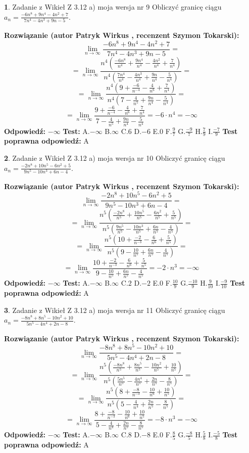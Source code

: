 \documentclass[12pt, a4paper]{article}
\theoremstyle{definition} %
\newtheorem{zad}{}
\newcommand{\zadStart}[1]{\begin{zad}#1\newline}
\newcommand{\zadStop}{\end{zad}}
\newcommand{\rozwStart}[2]{\noindent \textbf{Rozwiązanie (autor #1 , recenzent #2): }\newline}
\newcommand{\rozwStop}{\newline}
\newcommand{\odpStart}{\noindent \textbf{Odpowiedź:}\newline}
\newcommand{\odpStop}{\newline}
\newcommand{\testStart}{\noindent \textbf{Test:}\newline}
\newcommand{\testStop}{\newline}
\newcommand{\kluczStart}{\noindent \textbf{Test poprawna odpowiedź:}\newline}
\newcommand{\kluczStop}{\newline}
\begin{document}
\zadStart{Zadanie z Wikieł Z 3.12 a) moja wersja nr 9}
Obliczyć granicę ciągu $a_{n}=\frac{-6n^{8}+9n^{4}-4n^{2}+7}{7n^{4}-4n^{3}+9n-5}$.
\zadStop
\rozwStart{Patryk Wirkus}{Szymon Tokarski}
$$\lim\limits_{n\to\infty}\frac{-6n^{8}+9n^{4}-4n^{2}+7}{7n^{4}-4n^{3}+9n-5}=$$
$$=\lim\limits_{n\to\infty}\frac{n^{4}\left(\frac{-6n^{8}}{n^{4}}+\frac{9n^{4}}{n^{4}}-\frac{4n^{2}}{n^{4}}+\frac{7}{n^{4}}\right)}{n^{4}\left(\frac{7n^{4}}{n^{4}}-\frac{4n^{3}}{n^{4}}+\frac{9n}{n^{4}}-\frac{5}{n^{4}}\right)}=$$
$$=\lim\limits_{n\to\infty}\frac{n^{4}\left(9+\frac{-6}{n^{-4}}-\frac{4}{n^{6}}+\frac{7}{n^{4}}\right)}
{n^{4}\left(7-\frac{4}{n^{5}}+\frac{9n}{n^{4}}-\frac{5}{n^{4}}\right)}=$$
$$=\lim\limits_{n\to\infty}\frac{9+\frac{-6}{n^{-4}}-\frac{4}{n^{6}}+\frac{7}{n^{4}}}{7-\frac{4}{n^{5}}+\frac{9n}{n^{4}}-\frac{5}{n^{4}}}=-6\cdot n^{4} = -\infty$$
\rozwStop
\odpStart
$-\infty$
\odpStop
\testStart
A.$-\infty$
B.$\infty$
C.$6$
D.$-6$
E.$0$
F.$\frac{9}{7}$
G.$\frac{-9}{7}$
H.$\frac{7}{9}$
I.$\frac{-7}{9}$
\testStop
\kluczStart
A
\kluczStop



\zadStart{Zadanie z Wikieł Z 3.12 a) moja wersja nr 10}
Obliczyć granicę ciągu $a_{n}=\frac{-2n^{8}+10n^{5}-6n^{2}+5}{9n^{5}-10n^{3}+6n-4}$.
\zadStop
\rozwStart{Patryk Wirkus}{Szymon Tokarski}
$$\lim\limits_{n\to\infty}\frac{-2n^{8}+10n^{5}-6n^{2}+5}{9n^{5}-10n^{3}+6n-4}=$$
$$=\lim\limits_{n\to\infty}\frac{n^{5}\left(\frac{-2n^{8}}{n^{5}}+\frac{10n^{5}}{n^{5}}-\frac{6n^{2}}{n^{5}}+\frac{5}{n^{5}}\right)}{n^{5}\left(\frac{9n^{5}}{n^{5}}-\frac{10n^{3}}{n^{5}}+\frac{6n}{n^{5}}-\frac{4}{n^{5}}\right)}=$$
$$=\lim\limits_{n\to\infty}\frac{n^{5}\left(10+\frac{-2}{n^{-3}}-\frac{6}{n^{6}}+\frac{5}{n^{5}}\right)}
{n^{5}\left(9-\frac{10}{n^{5}}+\frac{6n}{n^{5}}-\frac{4}{n^{5}}\right)}=$$
$$=\lim\limits_{n\to\infty}\frac{10+\frac{-2}{n^{-3}}-\frac{6}{n^{6}}+\frac{5}{n^{5}}}{9-\frac{10}{n^{5}}+\frac{6n}{n^{5}}-\frac{4}{n^{5}}}=-2\cdot n^{3} = -\infty$$
\rozwStop
\odpStart
$-\infty$
\odpStop
\testStart
A.$-\infty$
B.$\infty$
C.$2$
D.$-2$
E.$0$
F.$\frac{10}{9}$
G.$\frac{-10}{9}$
H.$\frac{9}{10}$
I.$\frac{-9}{10}$
\testStop
\kluczStart
A
\kluczStop



\zadStart{Zadanie z Wikieł Z 3.12 a) moja wersja nr 11}
Obliczyć granicę ciągu $a_{n}=\frac{-8n^{8}+8n^{5}-10n^{2}+10}{5n^{5}-4n^{4}+2n-8}$.
\zadStop
\rozwStart{Patryk Wirkus}{Szymon Tokarski}
$$\lim\limits_{n\to\infty}\frac{-8n^{8}+8n^{5}-10n^{2}+10}{5n^{5}-4n^{4}+2n-8}=$$
$$=\lim\limits_{n\to\infty}\frac{n^{5}\left(\frac{-8n^{8}}{n^{5}}+\frac{8n^{5}}{n^{5}}-\frac{10n^{2}}{n^{5}}+\frac{10}{n^{5}}\right)}{n^{5}\left(\frac{5n^{5}}{n^{5}}-\frac{4n^{4}}{n^{5}}+\frac{2n}{n^{5}}-\frac{8}{n^{5}}\right)}=$$
$$=\lim\limits_{n\to\infty}\frac{n^{5}\left(8+\frac{-8}{n^{-3}}-\frac{10}{n^{6}}+\frac{10}{n^{5}}\right)}
{n^{5}\left(5-\frac{4}{n^{4}}+\frac{2n}{n^{5}}-\frac{8}{n^{5}}\right)}=$$
$$=\lim\limits_{n\to\infty}\frac{8+\frac{-8}{n^{-3}}-\frac{10}{n^{6}}+\frac{10}{n^{5}}}{5-\frac{4}{n^{4}}+\frac{2n}{n^{5}}-\frac{8}{n^{5}}}=-8\cdot n^{3} = -\infty$$
\rozwStop
\odpStart
$-\infty$
\odpStop
\testStart
A.$-\infty$
B.$\infty$
C.$8$
D.$-8$
E.$0$
F.$\frac{8}{5}$
G.$\frac{-8}{5}$
H.$\frac{5}{8}$
I.$\frac{-5}{8}$
\testStop
\kluczStart
A
\kluczStop
\end{document}
